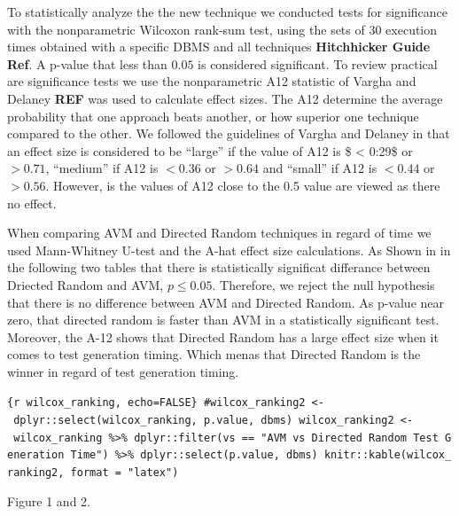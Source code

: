 \documentclass[runningheads,a4paper]{llncs}
\begin{document}
To statistically analyze the the new technique we conducted tests for
significance with the nonparametric Wilcoxon rank-sum test, using the
sets of 30 execution times obtained with a specific DBMS and all
techniques \textbf{Hitchhicker Guide Ref}. A p-value that less than
\(0.05\) is considered significant. To review practical are significance
tests we use the nonparametric A12 statistic of Vargha and Delaney
\textbf{REF} was used to calculate effect sizes. The A12 determine the
average probability that one approach beats another, or how superior one
technique compared to the other. We followed the guidelines of Vargha
and Delaney in that an effect size is considered to be \enquote{large}
if the value of A12 is \$ \textless{} 0:29\$ or \(> 0.71\),
\enquote{medium} if A12 is \(< 0.36\) or \(> 0.64\) and \enquote{small}
if A12 is \(< 0.44\) or \(> 0.56\). However, is the values of A12 close
to the 0.5 value are viewed as there no effect.

When comparing AVM and Directed Random techniques in regard of time we
used Mann-Whitney U-test and the A-hat effect size calculations. As
Shown in in the following two tables that there is statistically
significat differance between Driected Random and AVM, \(p \leq 0.05\).
Therefore, we reject the null hypothesis that there is no difference
between AVM and Directed Random. As p-value near zero, that directed
random is faster than AVM in a statistically significant test. Moreover,
the A-12 shows that Directed Random has a large effect size when it
comes to test generation timing. Which menas that Directed Random is the
winner in regard of test generation timing.

\texttt{\{r\ wilcox\_ranking,\ echo=FALSE\}\ \#wilcox\_ranking2\ \textless{}-\ dplyr::select(wilcox\_ranking,\ p.value,\ dbms)\ wilcox\_ranking2\ \textless{}-\ wilcox\_ranking\ \%\textgreater{}\%\ dplyr::filter(vs\ ==\ "AVM\ vs\ Directed\ Random\ Test\ Generation\ Time")\ \%\textgreater{}\%\ dplyr::select(p.value,\ dbms)\ knitr::kable(wilcox\_ranking2,\ format\ =\ "latex")}

Figure 1 and 2.
\end{document}
